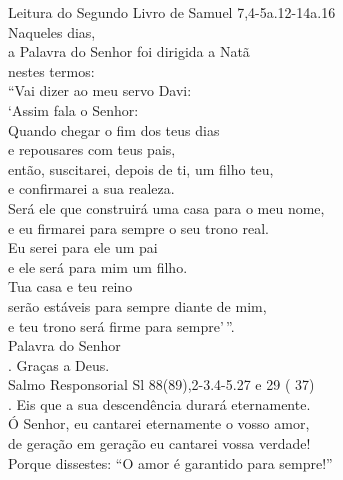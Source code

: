 \documentclass{book}
\begin{document}
\begin{flushleft}
    Leitura do Segundo Livro de Samuel
    \hspace{\fill}
    \textcolor{VioletRed2}{7,4-5a.12-14a.16}
    \vspace{.2cm} \\
    Naqueles dias, \\
    a Palavra do Senhor foi dirigida a Natã \\
    nestes termos: \\
    ``Vai dizer ao meu servo Davi: \\
    `Assim fala o Senhor: \\
    Quando chegar o fim dos teus dias \\
    e repousares com teus pais, \\
    então, suscitarei, depois de ti, um filho teu, \\
    e confirmarei a sua realeza. \\
    Será ele que construirá uma casa para o meu nome, \\
    e eu firmarei para sempre o seu trono real. \\
    Eu serei para ele um pai \\
    e ele será para mim um filho. \\
    Tua casa e teu reino \\
    serão estáveis para sempre diante de mim, \\
    e teu trono será firme para sempre'\,''.
    \vspace{.2cm} \\
    Palavra do Senhor \\
    {\color{VioletRed2} \Rbar.} Graças a Deus.
    \vspace{.2cm} \\
    \textcolor{VioletRed2}{Salmo Responsorial
        \hspace{\fill} Sl 88(89),2-3.4-5.27 e 29 (\RbarRed{} 37)}
    \vspace{.2cm} \\
    {\color{VioletRed2} \Rbar.} Eis que a sua descendência durará eternamente.
    \vspace{.2cm} \\
    Ó Senhor, eu cantarei eternamente o vosso amor, \textsuperscript{\gresixstar{}} \\
    de geração em geração eu cantarei vossa verdade! \\
    Porque dissestes: ``O amor é garantido para sempre!'' \textsuperscript{\gresixstar{}} \\

\end{flushleft}
\end{document}
